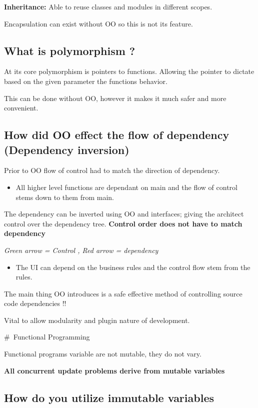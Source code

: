 \documentclass[11pt]{scrartcl} %
\begin{document}
\textbf{Inheritance:} Able to reuse classes and modules in different
scopes.

Encapsulation can exist without OO so this is not its feature.

\subsection{What is polymorphism ?}

At its core polymorphism is pointers to functions. Allowing the pointer
to dictate based on the given parameter the functions behavior.

This can be done without OO, however it makes it much safer and more
convenient.

\subsection{How did OO effect the flow of dependency (Dependency
inversion)}

Prior to OO flow of control had to match the direction of dependency.

\begin{itemize}
\item
  All higher level functions are dependant on main and the flow of
  control stems down to them from main.
\end{itemize}

The dependency can be inverted using OO and interfaces; giving the
architect control over the dependency tree. \textbf{Control order does
not have to match dependency}

\emph{Green arrow = Control , Red arrow = dependency}

\begin{itemize}
\item
  The UI can depend on the business rules and the control flow stem from
  the rules.
\end{itemize}

The main thing OO introduces is a safe effective method of controlling
source code dependencies !!

Vital to allow modularity and plugin nature of development.

\#~Functional Programming

Functional programs variable are not mutable, they do not vary.

\textbf{All concurrent update problems derive from mutable variables}

\subsection{How do you utilize immutable variables}
\end{document}
